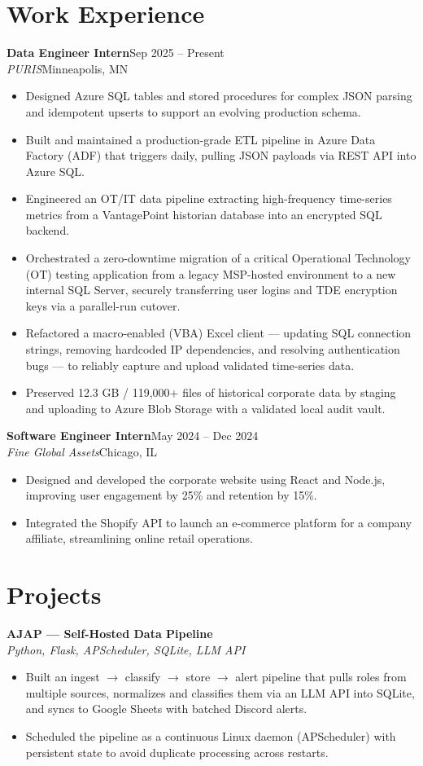 \documentclass[letterpaper,10.5pt]{article}
\newcommand{\entry}[4]{\textbf{#1}\hfill{\small #2}\\\textit{\small #3}\hfill{\small #4}\par\vspace{1pt}}
\begin{document}
\section{Work Experience}
\entry{Data Engineer Intern}{Sep 2025 -- Present}{PURIS}{Minneapolis, MN}
\begin{itemize}
  \item Designed Azure SQL tables and stored procedures for complex JSON parsing and idempotent upserts to support an evolving production schema.
  \item Built and maintained a production-grade ETL pipeline in Azure Data Factory (ADF) that triggers daily, pulling JSON payloads via REST API into Azure SQL.
  \item Engineered an OT/IT data pipeline extracting high-frequency time-series metrics from a VantagePoint historian database into an encrypted SQL backend.
  \item Orchestrated a zero-downtime migration of a critical Operational Technology (OT) testing application from a legacy MSP-hosted environment to a new internal SQL Server, securely transferring user logins and TDE encryption keys via a parallel-run cutover.
  \item Refactored a macro-enabled (VBA) Excel client --- updating SQL connection strings, removing hardcoded IP dependencies, and resolving authentication bugs --- to reliably capture and upload validated time-series data.
  \item Preserved 12.3 GB / 119,000+ files of historical corporate data by staging and uploading to Azure Blob Storage with a validated local audit vault.
\end{itemize}

\entry{Software Engineer Intern}{May 2024 -- Dec 2024}{Fine Global Assets}{Chicago, IL}
\begin{itemize}
  \item Designed and developed the corporate website using React and Node.js, improving user engagement by 25\% and retention by 15\%.
  \item Integrated the Shopify API to launch an e-commerce platform for a company affiliate, streamlining online retail operations.
\end{itemize}

\section{Projects}
\entry{AJAP --- Self-Hosted Data Pipeline}{}{Python, Flask, APScheduler, SQLite, LLM API}{}
\begin{itemize}
  \item Built an ingest $\rightarrow$ classify $\rightarrow$ store $\rightarrow$ alert pipeline that pulls roles from multiple sources, normalizes and classifies them via an LLM API into SQLite, and syncs to Google Sheets with batched Discord alerts.
  \item Scheduled the pipeline as a continuous Linux daemon (APScheduler) with persistent state to avoid duplicate processing across restarts.
\end{itemize}
\end{document}

